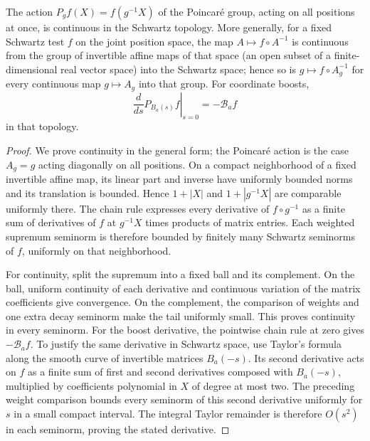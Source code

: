 \begin{lemma}\label{lem:schwartz-motion}
The action $P_gf(X)=f(g^{-1}X)$ of the Poincar\'e group, acting on all
positions at once, is continuous in the Schwartz topology. More
generally, for a fixed Schwartz test $f$ on the joint position space, the
map $A\mapsto f\circ A^{-1}$ is continuous from the group of invertible
affine maps of that space (an open subset of a finite-dimensional real
vector space) into the Schwartz space; hence so is $g\mapsto f\circ A_g^{-1}$
for every continuous map $g\mapsto A_g$ into that group. For coordinate
boosts,
\[
 \left.\frac{d}{ds}P_{B_a(s)}f\right|_{s=0}=-\mathcal B_af
\]
in that topology.
\end{lemma}
\begin{proof}
We prove continuity in the general form; the Poincar\'e action is the
case $A_g=g$ acting diagonally on all positions.
On a compact neighborhood of a fixed invertible affine map, its linear
part and inverse have uniformly bounded norms and its translation is
bounded. Hence $1+|X|$ and $1+|g^{-1}X|$ are comparable uniformly there.
The chain rule expresses every derivative of $f\circ g^{-1}$ as a finite
sum of derivatives of $f$ at $g^{-1}X$ times products of matrix entries.
Each weighted supremum seminorm is therefore bounded by finitely many
Schwartz seminorms of $f$, uniformly on that neighborhood.

For continuity, split the supremum into a fixed ball and its complement.
On the ball, uniform continuity of each derivative and continuous variation
of the matrix coefficients give convergence. On the complement, the
comparison of weights and one extra decay seminorm make the tail uniformly
small. This proves continuity in every seminorm.
For the boost derivative, the pointwise chain rule at zero gives
$-\mathcal B_af$. To justify the same derivative in Schwartz space, use
Taylor's formula along the smooth curve of invertible matrices
$B_a(-s)$. Its second derivative acts on $f$ as a finite sum of first and
second derivatives composed with $B_a(-s)$, multiplied by coefficients
polynomial in $X$ of degree at most two. The preceding weight comparison
bounds every seminorm of this second derivative uniformly for $s$ in a
small compact interval. The integral Taylor remainder is therefore
$O(s^2)$ in each seminorm, proving the stated derivative.
\end{proof}

